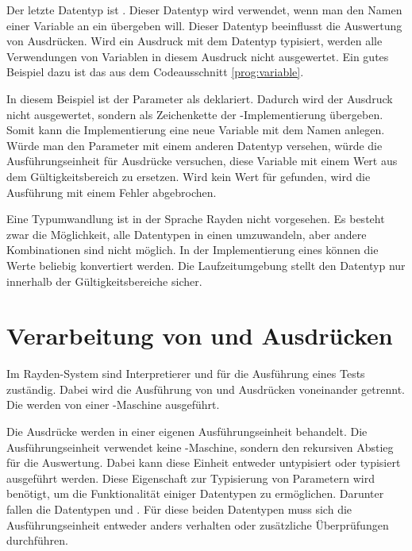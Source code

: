 \SuperPar
Der letzte Datentyp ist . Dieser Datentyp wird verwendet, wenn man den Namen einer Variable an ein  übergeben will. Dieser Datentyp beeinflusst die Auswertung von Ausdrücken. Wird ein Ausdruck mit dem Datentyp  typisiert, werden alle Verwendungen von Variablen in diesem Ausdruck nicht ausgewertet. Ein gutes Beispiel dazu ist das  aus dem Codeausschnitt \ref{prog:variable}.

\SuperPar
In diesem Beispiel ist der Parameter  als  deklariert. Dadurch wird der Ausdruck  nicht ausgewertet, sondern als Zeichenkette der -Implementierung übergeben. Somit kann die Implementierung eine neue Variable mit dem Namen  anlegen. Würde man den Parameter  mit einem anderen Datentyp versehen, würde die Ausführungseinheit für Ausdrücke versuchen, diese Variable mit einem Wert aus dem Gültigkeitsbereich zu ersetzen. Wird kein Wert für \enword{} gefunden, wird die Ausführung mit einem Fehler abgebrochen.

\SuperPar
Eine Typumwandlung ist in der Sprache Rayden nicht vorgesehen. Es besteht zwar die Möglichkeit, alle Datentypen in einen  umzuwandeln, aber andere Kombinationen sind nicht möglich. In der Implementierung eines  können die Werte beliebig konvertiert werden. Die Laufzeitumgebung stellt den Datentyp nur innerhalb der Gültigkeitsbereiche sicher.

\section{Verarbeitung von  und Ausdrücken}

Im Rayden-System sind Interpretierer und  für die Ausführung eines Tests zuständig. Dabei wird die Ausführung von  und Ausdrücken voneinander getrennt. Die  werden von einer -Maschine ausgeführt. 

\SuperPar
Die Ausdrücke werden in einer eigenen Ausführungseinheit behandelt. Die Ausführungseinheit verwendet keine -Maschine, sondern den rekursiven Abstieg für die Auswertung. Dabei kann diese Einheit entweder untypisiert oder typisiert ausgeführt werden. Diese Eigenschaft zur Typisierung von Parametern wird benötigt, um die Funktionalität einiger Datentypen zu ermöglichen. Darunter fallen die Datentypen  und . Für diese beiden Datentypen muss sich die Ausführungseinheit entweder anders verhalten oder zusätzliche Überprüfungen durchführen. 

